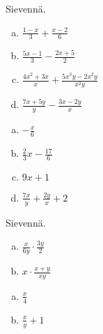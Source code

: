 \begin{tehtava}
Sievennä.
	\begin{enumerate}[a)]
	\item $ \frac{1-x}{3} + \frac{x-2}{6}$
	\item $ \frac{5x-1}{3} - \frac{2x+5}{2}$
	\item $\frac{4x^2+3x}{x} + \frac{5x^3y-2x^2y}{x^2y}$
	\item $\frac{7x+5y}{y} - \frac{3x-2y}{x}$
	\end{enumerate}

\begin{vastaus}
	\begin{enumerate}[a)]
	\item $ -\frac{x}{6}$
	\item $ \frac{2}{3} x - \frac{17}{6}$
	\item $9x+1$
	\item $\frac{7x}{y} + \frac{2y}{x} +2$
	\end{enumerate}
\end{vastaus}
\end{tehtava}

\begin{tehtava}
Sievennä.
	\begin{enumerate}[a)]
	\item $\frac{x}{6y} \cdot \frac{3y}{2}$
	\item $x \cdot \frac{x+y}{xy}$
	\end{enumerate}

\begin{vastaus}
	\begin{enumerate}[a)]
	\item $\frac{x}{4}$
	\item $\frac{x}{y} + 1$
	\end{enumerate}
\end{vastaus}
\end{tehtava}